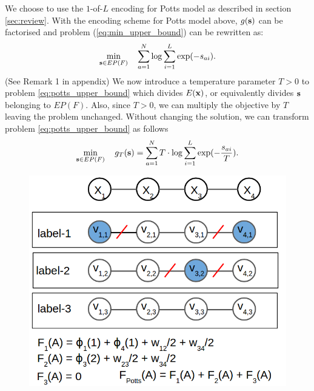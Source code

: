  We choose to use the $1$-of-$L$ encoding for Potts model as described in section \ref{sec:review}. With the encoding scheme for Potts model above, $g({\bf s})$ can be factorised and problem (\ref{eq:min_upper_bound}) can be rewritten as:
%
\begin{equation}
\min_{{\bf s} \in EP(F)} \quad \sum_{a = 1}^{N} \log \sum_{i = 1}^L \exp(-s_{ai}).
\label{eq:potts_upper_bound}
\end{equation}
(See Remark 1 in appendix)
 We now introduce
a temperature parameter $T > 0$ to problem \eqref{eq:potts_upper_bound} which
divides $E({\bf x})$, or equivalently divides $\bf s$ belonging to $EP(F)$. Also, since $T > 0$, we can multiply the objective by $T$ leaving the problem unchanged. Without changing the solution, we can transform problem \eqref{eq:potts_upper_bound} as follows
\begin{equation}
    \min_{{\bf s} \in EP(F)} \quad g_T ({\bf s}) = \sum_{a = 1}^{N} T \cdot \log \sum_{i = 1}^L \exp(-\frac{s_{ai}}{T}).
\label{eq:potts_temp}
\end{equation}

\begin{figure}
\centering
\includegraphics[scale = 0.30]{./figures/potts_chain_extension.png}
\label{fig:potts_extension_example}
\end{figure}

